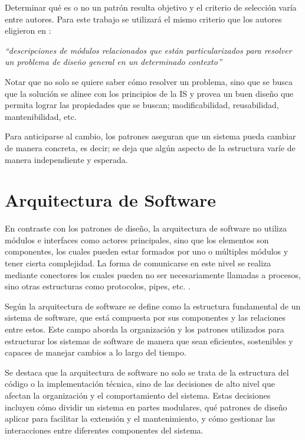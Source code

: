 Determinar qué es o no un patrón resulta objetivo y el criterio de selección varía entre autores. Para este trabajo se utilizará el mismo criterio que los autores eligieron en \cite{Gamma:1995:DPE:186897}:

\textit{``descripciones de módulos relacionados que están particularizados para resolver un problema de diseño general en un determinado contexto''}

Notar que no solo se quiere saber cómo resolver un problema, sino que se busca que la solución se alinee con los principios de la \gls{IS} y provea un buen diseño que permita lograr las propiedades que se buscan; modificabilidad, reusabilidad, mantenibilidad, etc.

Para anticiparse al cambio, los patrones aseguran que un sistema pueda cambiar de manera concreta, es decir; se deja que algún aspecto de la estructura varíe de manera independiente y esperada.


\section{Arquitectura de Software}
\label{secArq}

En contraste con los patrones de diseño, la arquitectura de software no utiliza módulos e interfaces como actores principales, sino que los elementos son componentes, los cuales pueden estar formados por uno o múltiples módulos y tener cierta complejidad. La forma de comunicarse en este nivel se realiza mediante conectores los cuales pueden no ser necesariamente llamadas a procesos, sino otras estructuras como protocolos, pipes, etc. \cite{bass2003, buschmann1996posa1}.

Según \cite{ShawGarlan1996} la arquitectura de software se define como la estructura fundamental de un sistema de software, que está compuesta por sus componentes y las relaciones entre estos. Este campo aborda la organización y los patrones utilizados para estructurar los sistemas de software de manera que sean eficientes, sostenibles y capaces de manejar cambios a lo largo del tiempo.

Se destaca que la arquitectura de software no solo se trata de la estructura del código o la implementación técnica, sino de las decisiones de alto nivel que afectan la organización y el comportamiento del sistema. Estas decisiones incluyen cómo dividir un sistema en partes modulares, qué patrones de diseño aplicar para facilitar la extensión y el mantenimiento, y cómo gestionar las interacciones entre diferentes componentes del sistema.


